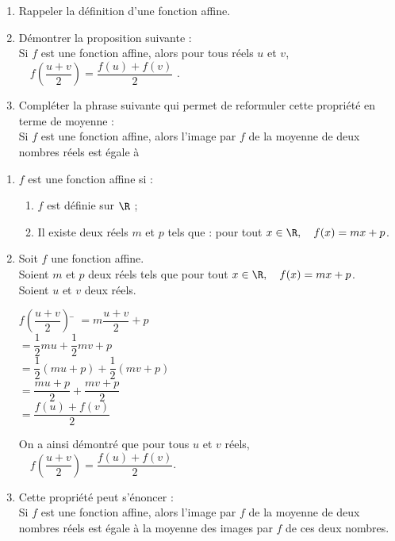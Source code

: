 \documentclass[a4paper,12pt,french]{article}
\begin{document}
\exo{}
\begin{enumerate}[\bfseries 1.]
	\item 	Rappeler la définition d'une fonction affine.
	\item 	Démontrer la proposition suivante :\\
			\og Si $f$ est une fonction affine, alors pour tous réels $u$ et $v$, $\quad f\left(\dfrac{u+v}{2}\right)=\dfrac{f(u)+f(v)}{2}$ \fg.
	\item	Compléter la phrase suivante qui permet de reformuler cette propriété en terme de moyenne :\\
	Si $f$ est une fonction affine, alors l'image par $f$ de la moyenne de deux nombres réels est égale à \dotfill\\
\end{enumerate}

\begin{exercicecorrection}
	\begin{enumerate}[\bfseries 1.]
		\item 	$f$ est une fonction affine si :
		\begin{enumerate}[\textbullet]
			\item 	$f$ est définie sur $\R$ ;
			\item 	Il existe deux réels $m$ et $p$ tels que : \quad pour tout $x\in \R, \quad f(x)=mx+p$.
		\end{enumerate}
		\item 	Soit $f$ une fonction affine.\\
		Soient $m$ et $p$ deux réels tels que pour tout $x\in \R, \quad f(x)=mx+p$.\\
		Soient $u$ et $v$ deux réels.
		\begin{tabbing}
			$f\left(\dfrac{u+v}{2}\right)$ \= $=m \dfrac{u+v}{2}+p$\\[0.5em]
			\>	$=\dfrac{1}{2}mu+\dfrac{1}{2}mv+p$\\[0.5em]
			\>	$=\dfrac{1}{2}(mu+p)+\dfrac{1}{2}(mv+p)$\\[0.5em]
			\>	$=\dfrac{mu+p}{2}+\dfrac{mv+p}{2}$\\[0.5em]
			\>	$=\dfrac{f(u)+f(v)}{2}$
		\end{tabbing}
		On a ainsi démontré que pour tous $u$ et $v$ réels, $\quad f\left(\dfrac{u+v}{2}\right)=\dfrac{f(u)+f(v)}{2}$.
		\item	Cette propriété peut s'énoncer :\\
		\og Si $f$ est une fonction affine, alors l'image par $f$ de la moyenne de deux nombres réels est égale à la moyenne des images par $f$ de ces deux nombres.\fg
	\end{enumerate}
\end{exercicecorrection}
\eject
\end{document}
